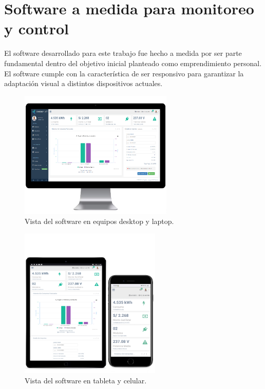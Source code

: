 \section{Software a medida para monitoreo y control}

El software desarrollado para este trabajo fue hecho a medida por ser parte fundamental dentro del objetivo inicial planteado como emprendimiento personal. El software cumple con la característica de ser responsivo para garantizar la adaptación visual a distintos dispositivos actuales.

\begin{figure}[htpb]
\centering 
\includegraphics[width=0.65\textwidth]{./Figures/responsive1.png}
\caption{Vista del software en equipos desktop y laptop.}
\label{fig:software1}
\end{figure}

\begin{figure}[htpb]
\centering 
\includegraphics[width=0.6\textwidth]{./Figures/responsive2.png}
\caption{Vista del software en tableta y celular.}
\label{fig:software2}
\end{figure}